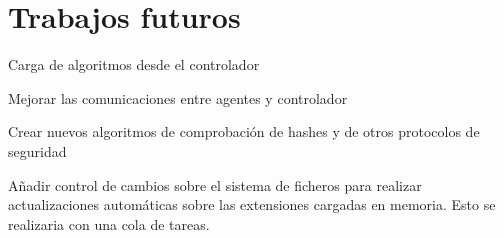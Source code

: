 \chapter{Trabajos futuros}\label{cap6}

Carga de algoritmos desde el controlador

Mejorar las comunicaciones entre agentes y controlador

Crear nuevos algoritmos de comprobación de hashes y de otros protocolos de seguridad

Añadir control de cambios sobre el sistema de ficheros para realizar actualizaciones automáticas sobre las extensiones cargadas en memoria. Esto se realizaria con una cola de tareas.

